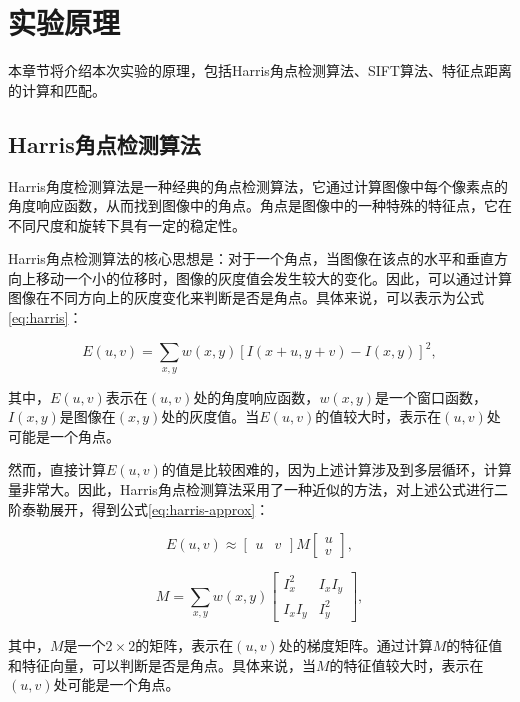 \section{实验原理}

本章节将介绍本次实验的原理，包括Harris角点检测算法、SIFT算法、特征点距离的计算和匹配。

\subsection{Harris角点检测算法}

Harris角度检测算法是一种经典的角点检测算法，它通过计算图像中每个像素点的角度响应函数，从而找到图像中的角点。角点是图像中的一种特殊的特征点，它在不同尺度和旋转下具有一定的稳定性。

Harris角点检测算法的核心思想是：对于一个角点，当图像在该点的水平和垂直方向上移动一个小的位移时，图像的灰度值会发生较大的变化。因此，可以通过计算图像在不同方向上的灰度变化来判断是否是角点。具体来说，可以表示为公式\ref{eq:harris}：

\begin{equation}
    E(u, v) = \sum_{x, y} w(x, y) [I(x + u, y + v) - I(x, y)]^2,
    \label{eq:harris}
\end{equation}

其中，$E(u, v)$表示在$(u, v)$处的角度响应函数，$w(x, y)$是一个窗口函数，$I(x, y)$是图像在$(x, y)$处的灰度值。当$E(u, v)$的值较大时，表示在$(u, v)$处可能是一个角点。

然而，直接计算$E(u, v)$的值是比较困难的，因为上述计算涉及到多层循环，计算量非常大。因此，Harris角点检测算法采用了一种近似的方法，对上述公式进行二阶泰勒展开，得到公式\ref{eq:harris-approx}：

\begin{equation}
    E(u, v) \approx \begin{bmatrix} u & v \end{bmatrix} M \begin{bmatrix} u \\ v \end{bmatrix},
    \label{eq:harris-approx}
\end{equation}

\begin{equation}
    M = \sum_{x, y} w(x, y) \begin{bmatrix} I_x^2 & I_x I_y \\ I_x I_y & I_y^2 \end{bmatrix},
\end{equation}

其中，$M$是一个$2 \times 2$的矩阵，表示在$(u, v)$处的梯度矩阵。通过计算$M$的特征值和特征向量，可以判断是否是角点。具体来说，当$M$的特征值较大时，表示在$(u, v)$处可能是一个角点。

